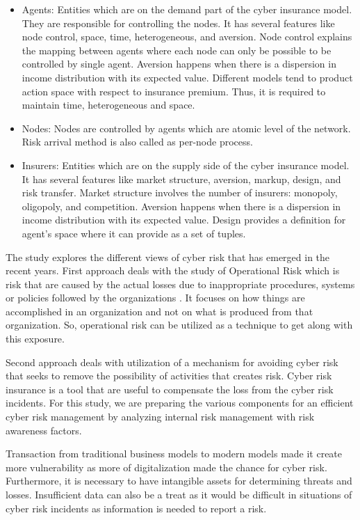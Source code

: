 \documentclass[conference]{IEEEtran}
\begin{document}
\begin{itemize}
\item Agents: Entities which are on the demand part of the cyber insurance model. They are responsible for controlling the nodes. It has several features like node control, space, time, heterogeneous, and aversion. Node control explains the mapping between agents where each node can only be possible to be controlled by single agent. Aversion happens when there is a dispersion in income distribution with its expected value. Different models tend to product action space with respect to insurance premium. Thus, it is required to maintain time, heterogeneous and space. 
\item Nodes: Nodes are controlled by agents which are atomic level of the network. Risk arrival method is also called as per-node process.   
\item Insurers: Entities which are on the supply side of the cyber insurance model. It has several features like market structure, aversion, markup, design, and risk transfer. Market structure involves the number of insurers: monopoly, oligopoly, and competition. Aversion happens when there is a dispersion in income distribution with its expected value. Design provides a definition for agent’s space where it can provide as a set of tuples. 
\end{itemize}

The study explores the different views of cyber risk that has emerged in the recent years. First approach deals with the study of Operational Risk which is risk that are caused by the actual losses due to inappropriate procedures, systems or policies followed by the organizations\cite{b20} \cite{b21}. It focuses on how things are accomplished in an organization and not on what is produced from that organization. So, operational risk can be utilized as a technique to get along with this exposure.

Second approach deals with utilization of a mechanism for avoiding cyber risk that seeks to remove the possibility of activities that creates risk\cite{b14}. Cyber risk insurance is a tool that are useful to compensate the loss from the cyber risk incidents\cite{b14}\cite{b22}. For this study, we are preparing the various components for an efficient cyber risk management by analyzing internal risk management with risk awareness factors.  



Transaction from traditional business models to modern models made it create more vulnerability as more of digitalization made the chance for cyber risk. Furthermore, it is necessary to have intangible assets for determining threats and losses. Insufficient data can also be a treat as it would be difficult in situations of cyber risk incidents as information is needed to report a risk. 
\end{document}
